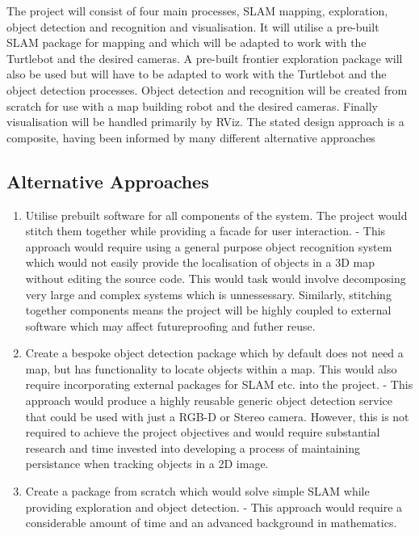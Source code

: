\documentclass{mproj}
\begin{document}
The project will consist of four main processes, SLAM mapping, exploration, object detection and recognition and visualisation. It will utilise a pre-built SLAM package for mapping and which will be adapted to work with the Turtlebot and the desired cameras. A pre-built frontier exploration package will also be used but will have to be adapted to work with the Turtlebot and the object detection processes. Object detection and recognition will be created from scratch for use with a map building robot and the desired cameras. Finally visualisation will be handled primarily by RViz. The stated design approach is a composite, having been informed by many different alternative approaches

\subsection{Alternative Approaches}

\begin{enumerate}
\item Utilise prebuilt software for all components of the system. The project would stitch them together while providing a facade for user interaction. - This approach would require using a general purpose object recognition system which would not easily provide the localisation of objects in a 3D map without editing the source code. This would task would involve decomposing very large and complex systems which is unnessessary. Similarly, stitching together components means the project will be highly coupled to external software which may affect futureproofing and futher reuse.
\item Create a bespoke object detection package which by default does not need a map, but has functionality to locate objects within a map. This would also require incorporating external packages for SLAM etc. into the project. - This approach would produce a highly reusable generic object detection service that could be used with just a RGB-D or Stereo camera. However, this is not required to achieve the project objectives and would require substantial research and time invested into developing a process of maintaining  persistance when tracking objects in a 2D image.
\item Create a package from scratch which would solve simple SLAM while providing exploration and object detection. - This approach  would require a considerable amount of time and an advanced background in mathematics.
\end{enumerate}
\end{document}
